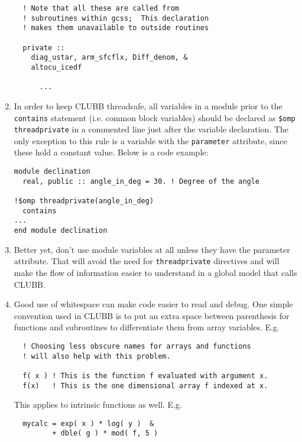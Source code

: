 \documentclass[letterpaper,12pt]{article}
\begin{document}
\begin{enumerate}
\begin{verbatim}
  ! Note that all these are called from 
  ! subroutines within gcss;  This declaration
  ! makes them unavailable to outside routines

  private ::
    diag_ustar, arm_sfcflx, Diff_denom, &
    altocu_icedf

      ...

\end{verbatim}

\item In order to keep CLUBB threadsafe, all variables in a module prior to the \texttt{contains}
statement (i.e. common block variables) should be declared as \texttt{\$omp threadprivate} in
a commented line just after the variable declaration.  The only exception to this rule is a 
variable with the \texttt{parameter} attribute, since these hold a constant value.  Below is a code example: \\
\begin{verbatim}
module declination
  real, public :: angle_in_deg = 30. ! Degree of the angle

!$omp threadprivate(angle_in_deg)
  contains
...
end module declination
\end{verbatim}

\item Better yet, don't use module variables at all unless they have the parameter attribute.  
That will avoid the need for \texttt{threadprivate} directives and will make the flow of information
easier to understand in a global model that calls CLUBB.

\item Good use of whitespace can make code easier to read and debug.  
One simple convention used in CLUBB is to put an extra space between 
parenthesis for functions and subroutines to differentiate them from 
array variables. \newline
E.g.
\begin{verbatim}
  ! Choosing less obscure names for arrays and functions 
  ! will also help with this problem.

  f( x ) ! This is the function f evaluated with argument x.
  f(x)   ! This is the one dimensional array f indexed at x.
\end{verbatim}

This applies to intrinsic functions as well. \newline
E.g.
\begin{verbatim}
  mycalc = exp( x ) * log( y )  &
         + dble( g ) * mod( f, 5 )
\end{verbatim}


\end{enumerate}
\end{document}
